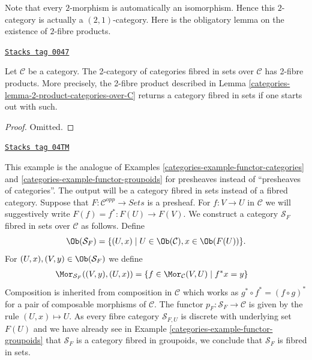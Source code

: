 Note that every $2$-morphism is automatically an isomorphism.
Hence this $2$-category is actually a $(2, 1)$-category.
Here is the obligatory lemma on the existence of $2$-fibre products.

\begin{lemma}
\label{categories-lemma-2-product-categories-fibred-sets}
\href{https://stacks.math.columbia.edu/tag/0047}{\texttt{Stacks tag 0047}}

Let $\mathcal{C}$ be a category.
The 2-category of categories fibred in sets over $\mathcal{C}$
has 2-fibre products. More precisely, the 2-fibre product described in
Lemma \ref{categories-lemma-2-product-categories-over-C}
returns a category fibred in sets if one starts out with such.
\end{lemma}

\begin{proof}
Omitted.
\end{proof}

\begin{example}[Presheaf]
\label{categories-example-presheaf}
\href{https://stacks.math.columbia.edu/tag/04TM}{\texttt{Stacks tag 04TM}}

This example is the analogue of
Examples \ref{categories-example-functor-categories} and
\ref{categories-example-functor-groupoids}
for presheaves instead of ``presheaves of categories''.
The output will be a category fibred in sets instead of a fibred category.
Suppose that $F : \mathcal{C}^{opp} \to \textit{Sets}$ is a presheaf.
For $f : V \to U$ in $\mathcal{C}$ we will
suggestively write $F(f) = f^\ast : F(U) \to F(V)$.
We construct a category $\mathcal{S}_F$ fibred in sets over $\mathcal{C}$
as follows. Define
$$
\Ob(\mathcal{S}_F) =
\{(U, x) \mid U \in \Ob(\mathcal{C}), x \in \Ob(F(U))\}.
$$
For $(U, x), (V, y) \in \Ob(\mathcal{S}_F)$ we define
\begin{align*}
\Mor_{\mathcal{S}_F}((V, y), (U, x))
& =
\{f \in \Mor_\mathcal{C}(V, U) \mid f^*x = y\}
\end{align*}
Composition is inherited from composition in $\mathcal{C}$
which works as $g^\ast \circ f^\ast = (f \circ g)^\ast$
for a pair of composable morphisms of $\mathcal{C}$.
The functor $p_F : \mathcal{S}_F \to \mathcal{C}$
is given by the rule $(U, x) \mapsto U$.
As every fibre category $\mathcal{S}_{F, U}$ is discrete with underlying
set $F(U)$ and we have already see in
Example \ref{categories-example-functor-groupoids}
that $\mathcal{S}_F$ is a category fibred in groupoids,
we conclude that $\mathcal{S}_F$ is fibred in sets.
\end{example}

